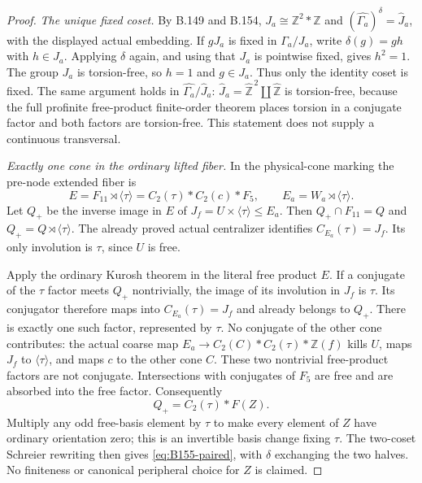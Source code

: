 \begin{proof}
\emph{The unique fixed coset.}
By B.149 and B.154,
$J_a\cong\mathbb Z^2*\mathbb Z$ and
$(\widehat{\Gamma_a})^\delta=\widehat J_a$, with the displayed actual
embedding. If $gJ_a$ is fixed in $\Gamma_a/J_a$, write
$\delta(g)=gh$ with $h\in J_a$. Applying $\delta$ again, and using that
$J_a$ is pointwise fixed, gives $h^2=1$. The group $J_a$ is torsion-free,
so $h=1$ and $g\in J_a$. Thus only the identity coset is fixed.
The same argument holds in $\widehat{\Gamma_a}/\widehat J_a$:
$\widehat J_a=\widehat{\mathbb Z}^{\,2}\amalg\widehat{\mathbb Z}$ is
torsion-free, because the full profinite free-product finite-order
theorem places torsion in a conjugate factor and both factors are
torsion-free. This statement does not supply a continuous transversal.

\emph{Exactly one cone in the ordinary lifted fiber.}
In the physical-cone marking the pre-node extended fiber is
\[
 E=F_{11}\rtimes\langle\tau\rangle
   =C_2(\tau)*C_2(c)*F_5,
 \qquad E_a=W_a\rtimes\langle\tau\rangle.
\]
Let $Q_+$ be the inverse image in $E$ of
$J_f=U\times\langle\tau\rangle\le E_a$. Then
$Q_+\cap F_{11}=Q$ and $Q_+=Q\rtimes\langle\tau\rangle$.
The already proved actual centralizer identifies
$C_{E_a}(\tau)=J_f$. Its only involution is $\tau$, since $U$ is free.

Apply the ordinary Kurosh theorem in the literal free product $E$.
If a conjugate of the $\tau$ factor meets $Q_+$ nontrivially, the image
of its involution in $J_f$ is $\tau$. Its conjugator therefore maps
into $C_{E_a}(\tau)=J_f$ and already belongs to $Q_+$. There is exactly
one such factor, represented by $\tau$. No conjugate of the other
cone contributes: the actual coarse map
$E_a\to C_2(C)*C_2(\tau)*\mathbb Z(f)$ kills $U$, maps $J_f$ to
$\langle\tau\rangle$, and maps $c$ to the other cone $C$.
These two nontrivial free-product factors are not conjugate.
Intersections with conjugates of $F_5$ are free and are absorbed into
the free factor. Consequently
\[
 Q_+=C_2(\tau)*F(Z).
\]
Multiply any odd free-basis element by $\tau$ to make every element of
$Z$ have ordinary orientation zero; this is an invertible basis change
fixing $\tau$. The two-coset Schreier rewriting then gives
\eqref{eq:B155-paired}, with $\delta$ exchanging the two halves.
No finiteness or canonical peripheral choice for $Z$ is claimed.


\end{proof}
